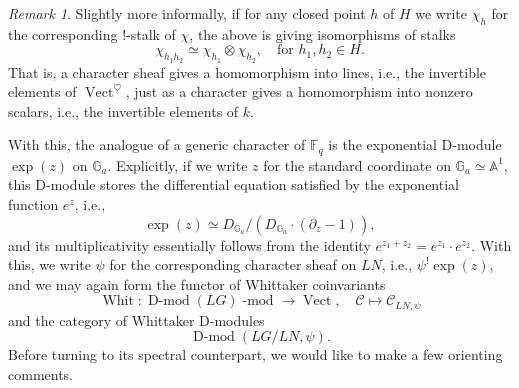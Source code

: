 \documentclass[10pt]{amsart}
\newcommand{\on}{\operatorname}
\renewcommand{\mod}{\on{-mod}}
\newcommand{\Dmod}{\on{D-mod}}
\newcommand{\Fq}{\mathbb{F}_q}
\newcommand{\Vect}{\on{Vect}}
\theoremstyle{remark}
\newtheorem{re}[subsubsection]{Remark}
\numberwithin{equation}{section}
\newcommand{\sC}{\mathscr{C}}
\renewcommand{\mod}{\operatorname{-mod}}
\begin{document}
\begin{re} Slightly 
more informally, if for any closed point $h$ of $H$ we write $\chi_h$ for the corresponding 
$!$-stalk of $\chi$, the above is giving isomorphisms of stalks 
%
\[
\chi_{h_1 h_2} \simeq \chi_{h_1} \otimes \chi_{h_2}, \quad \text{for } h_1, 
h_2 \in H.
\]
%
That is, a character sheaf gives a homomorphism into lines, i.e., the 
invertible elements of $\Vect^\heartsuit$, just as a character gives a homomorphism into 
nonzero scalars, i.e., the invertible elements of $k$. 
\end{re} 	

With this, the analogue of a generic character of $\Fq$ is the exponential 
D-module $\on{exp}(z)$ on $\mathbb{G}_a$. Explicitly, if we write $z$ for the 
standard coordinate on $\mathbb{G}_a \simeq \mathbb{A}^1$, this D-module stores 
the differential equation satisfied by the exponential function $e^z$, i.e., 
%
\[
\on{exp}(z) \simeq D_{\mathbb{G}_a} / ( D_{\mathbb{G}_a} \cdot (\partial_z - 
1)), 
\]
%
and its multiplicativity essentially follows from the identity $e^{z_1 + z_2} = 
e^{z_1} \cdot e^{z_2}$. With this, we write $\psi$ for the corresponding 
character sheaf on $LN$, i.e., $\psi^! \on{exp}(z)$, and we may again form the 
functor of Whittaker coinvariants 
%
\[
    \on{Whit}: \Dmod(LG)\mod \rightarrow \Vect, \quad \sC \mapsto \sC_{LN, 
    \psi}
\]
%
and the category of Whittaker D-modules 
%
\begin{equation} \label{e:catwhitsheaves}
    \Dmod(LG / LN, \psi). 
\end{equation}
%	
Before turning to its spectral counterpart, we would like to make a few 
orienting comments. 
\end{document}
